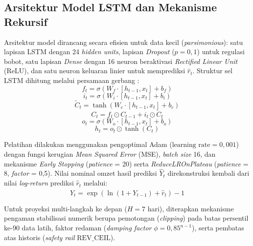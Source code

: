 \documentclass[10pt,a4paper]{article}
\begin{document}
\subsection{Arsitektur Model LSTM dan Mekanisme Rekursif}

Arsitektur model dirancang secara efisien untuk data kecil (\textit{parsimonious}): satu lapisan LSTM dengan 24 \textit{hidden units}, lapisan \textit{Dropout} ($p=0,1$) untuk regulasi bobot, satu lapisan \textit{Dense} dengan 16 neuron beraktivasi \textit{Rectified Linear Unit} (ReLU), dan satu neuron keluaran linier untuk memprediksi $\hat{r}_t$. Struktur sel LSTM dihitung melalui persamaan gerbang \cite{hochreiter1997long}:
\begin{equation}
  f_t = \sigma(W_f \cdot [h_{t-1}, x_t] + b_f)
  \label{eq:lstm_forget}
\end{equation}
\begin{equation}
  i_t = \sigma(W_i \cdot [h_{t-1}, x_t] + b_i)
  \label{eq:lstm_input}
\end{equation}
\begin{equation}
  \tilde{C}_t = \tanh(W_c \cdot [h_{t-1}, x_t] + b_c)
  \label{eq:lstm_candidate}
\end{equation}
\begin{equation}
  C_t = f_t \odot C_{t-1} + i_t \odot \tilde{C}_t
  \label{eq:lstm_cell}
\end{equation}
\begin{equation}
  o_t = \sigma(W_o \cdot [h_{t-1}, x_t] + b_o)
  \label{eq:lstm_output}
\end{equation}
\begin{equation}
  h_t = o_t \odot \tanh(C_t)
  \label{eq:lstm_hidden}
\end{equation}

Pelatihan dilakukan menggunakan pengoptimal Adam ($\text{learning rate} = 0,001$) dengan fungsi kerugian \textit{Mean Squared Error} (MSE), \textit{batch size} 16, dan mekanisme \textit{Early Stopping} (\textit{patience} = 20) serta \textit{ReduceLROnPlateau} (\textit{patience} = 8, \textit{factor} = 0,5). Nilai nominal omzet hasil prediksi $\hat{Y}_{t}$ direkonstruksi kembali dari nilai \textit{log-return} prediksi $\hat{r}_t$ melalui:
\begin{equation}
  \hat{Y}_{t} = \exp\left( \ln(1 + Y_{t-1}) + \hat{r}_t \right) - 1
  \label{eq:inverse_log}
\end{equation}

Untuk proyeksi multi-langkah ke depan ($H=7$ hari), diterapkan mekanisme pengaman stabilisasi numerik berupa pemotongan (\textit{clipping}) pada batas persentil ke-90 data latih, faktor redaman (\textit{damping factor} $\phi=0,85^{n-1}$), serta pembatas atas historis (\textit{safety rail} $\text{REV\_CEIL}$).
\end{document}
